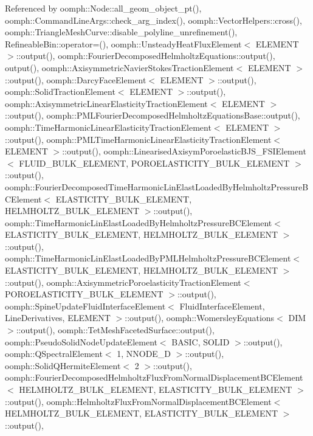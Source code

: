 Referenced by oomph\+::\+Node\+::all\+\_\+geom\+\_\+object\+\_\+pt(), oomph\+::\+Command\+Line\+Args\+::check\+\_\+arg\+\_\+index(), oomph\+::\+Vector\+Helpers\+::cross(), oomph\+::\+Triangle\+Mesh\+Curve\+::disable\+\_\+polyline\+\_\+unrefinement(), Refineable\+Bin\+::operator=(), oomph\+::\+Unsteady\+Heat\+Flux\+Element$<$ E\+L\+E\+M\+E\+N\+T $>$\+::output(), oomph\+::\+Fourier\+Decomposed\+Helmholtz\+Equations\+::output(), output(), oomph\+::\+Axisymmetric\+Navier\+Stokes\+Traction\+Element$<$ E\+L\+E\+M\+E\+N\+T $>$\+::output(), oomph\+::\+Darcy\+Face\+Element$<$ E\+L\+E\+M\+E\+N\+T $>$\+::output(), oomph\+::\+Solid\+Traction\+Element$<$ E\+L\+E\+M\+E\+N\+T $>$\+::output(), oomph\+::\+Axisymmetric\+Linear\+Elasticity\+Traction\+Element$<$ E\+L\+E\+M\+E\+N\+T $>$\+::output(), oomph\+::\+P\+M\+L\+Fourier\+Decomposed\+Helmholtz\+Equations\+Base\+::output(), oomph\+::\+Time\+Harmonic\+Linear\+Elasticity\+Traction\+Element$<$ E\+L\+E\+M\+E\+N\+T $>$\+::output(), oomph\+::\+P\+M\+L\+Time\+Harmonic\+Linear\+Elasticity\+Traction\+Element$<$ E\+L\+E\+M\+E\+N\+T $>$\+::output(), oomph\+::\+Linearised\+Axisym\+Poroelastic\+B\+J\+S\+\_\+\+F\+S\+I\+Element$<$ F\+L\+U\+I\+D\+\_\+\+B\+U\+L\+K\+\_\+\+E\+L\+E\+M\+E\+N\+T, P\+O\+R\+O\+E\+L\+A\+S\+T\+I\+C\+I\+T\+Y\+\_\+\+B\+U\+L\+K\+\_\+\+E\+L\+E\+M\+E\+N\+T $>$\+::output(), oomph\+::\+Fourier\+Decomposed\+Time\+Harmonic\+Lin\+Elast\+Loaded\+By\+Helmholtz\+Pressure\+B\+C\+Element$<$ E\+L\+A\+S\+T\+I\+C\+I\+T\+Y\+\_\+\+B\+U\+L\+K\+\_\+\+E\+L\+E\+M\+E\+N\+T, H\+E\+L\+M\+H\+O\+L\+T\+Z\+\_\+\+B\+U\+L\+K\+\_\+\+E\+L\+E\+M\+E\+N\+T $>$\+::output(), oomph\+::\+Time\+Harmonic\+Lin\+Elast\+Loaded\+By\+Helmholtz\+Pressure\+B\+C\+Element$<$ E\+L\+A\+S\+T\+I\+C\+I\+T\+Y\+\_\+\+B\+U\+L\+K\+\_\+\+E\+L\+E\+M\+E\+N\+T, H\+E\+L\+M\+H\+O\+L\+T\+Z\+\_\+\+B\+U\+L\+K\+\_\+\+E\+L\+E\+M\+E\+N\+T $>$\+::output(), oomph\+::\+Time\+Harmonic\+Lin\+Elast\+Loaded\+By\+P\+M\+L\+Helmholtz\+Pressure\+B\+C\+Element$<$ E\+L\+A\+S\+T\+I\+C\+I\+T\+Y\+\_\+\+B\+U\+L\+K\+\_\+\+E\+L\+E\+M\+E\+N\+T, H\+E\+L\+M\+H\+O\+L\+T\+Z\+\_\+\+B\+U\+L\+K\+\_\+\+E\+L\+E\+M\+E\+N\+T $>$\+::output(), oomph\+::\+Axisymmetric\+Poroelasticity\+Traction\+Element$<$ P\+O\+R\+O\+E\+L\+A\+S\+T\+I\+C\+I\+T\+Y\+\_\+\+B\+U\+L\+K\+\_\+\+E\+L\+E\+M\+E\+N\+T $>$\+::output(), oomph\+::\+Spine\+Update\+Fluid\+Interface\+Element$<$ Fluid\+Interface\+Element, Line\+Derivatives, E\+L\+E\+M\+E\+N\+T $>$\+::output(), oomph\+::\+Womersley\+Equations$<$ D\+I\+M $>$\+::output(), oomph\+::\+Tet\+Mesh\+Faceted\+Surface\+::output(), oomph\+::\+Pseudo\+Solid\+Node\+Update\+Element$<$ B\+A\+S\+I\+C, S\+O\+L\+I\+D $>$\+::output(), oomph\+::\+Q\+Spectral\+Element$<$ 1, N\+N\+O\+D\+E\+\_\+D $>$\+::output(), oomph\+::\+Solid\+Q\+Hermite\+Element$<$ 2 $>$\+::output(), oomph\+::\+Fourier\+Decomposed\+Helmholtz\+Flux\+From\+Normal\+Displacement\+B\+C\+Element$<$ H\+E\+L\+M\+H\+O\+L\+T\+Z\+\_\+\+B\+U\+L\+K\+\_\+\+E\+L\+E\+M\+E\+N\+T, E\+L\+A\+S\+T\+I\+C\+I\+T\+Y\+\_\+\+B\+U\+L\+K\+\_\+\+E\+L\+E\+M\+E\+N\+T $>$\+::output(), oomph\+::\+Helmholtz\+Flux\+From\+Normal\+Displacement\+B\+C\+Element$<$ H\+E\+L\+M\+H\+O\+L\+T\+Z\+\_\+\+B\+U\+L\+K\+\_\+\+E\+L\+E\+M\+E\+N\+T, E\+L\+A\+S\+T\+I\+C\+I\+T\+Y\+\_\+\+B\+U\+L\+K\+\_\+\+E\+L\+E\+M\+E\+N\+T $>$\+::output(), 